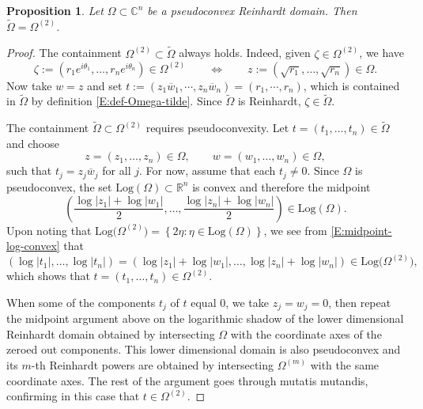 \documentclass[letterpaper,11pt,reqno]{amsart}
\theoremstyle{plain}
\newtheorem{proposition}[equation]{Proposition}
\theoremstyle{definition}
\theoremstyle{remark}
\theoremstyle{remark}
\numberwithin{equation}{section}
\newcommand{\ol}{\overline}
\newcommand{\wt}{\widetilde}
\newcommand{\C}{{\mathbb C}}
\newcommand{\R}{{\mathbb R}}
\begin{document}
\begin{proposition}\label{P:Omega-tilde=Omega2}
Let $\Omega \subset \C^n$ be a pseudoconvex Reinhardt domain.
Then $\wt\Omega = \Omega^{(2)}$.
\end{proposition}
\begin{proof}
The containment $\Omega^{(2)} \subset \wt\Omega$ always holds.
Indeed, given $\zeta \in \Omega^{(2)}$, we have
\[
\zeta := (r_1 e^{i\theta_1}, \dots, r_n e^{i\theta_n}) \in \Omega^{(2)} 
\qquad \Longleftrightarrow \qquad
z := \left(\sqrt{r_1}, \dots, \sqrt{r_n} \right) \in \Omega.
\]
Now take $w = z$ and set $t := (z_1\ol{w}_1,\cdots,z_n\ol{w}_n) = (r_1,\cdots,r_n)$, which is contained in $\wt\Omega$ by definition \eqref{E:def-Omega-tilde}.
Since $\wt\Omega$ is Reinhardt, $\zeta \in \wt\Omega$.

The containment $\wt\Omega \subset \Omega^{(2)}$ requires pseudoconvexity.
Let $t = (t_1,\dots,t_n) \in \wt\Omega$ and choose
\[
z = (z_1,\dots,z_n)\in \Omega, \qquad w = (w_1,\dots,w_n) \in \Omega,
\]
such that $t_j = z_j \ol{w}_j$ for all $j$.
For now, assume that each $t_j \neq 0$.
Since $\Omega$ is pseudoconvex, the set $\mathrm{Log}(\Omega) \subset \R^n$ is convex and therefore the midpoint
\begin{equation}\label{E:midpoint-log-convex}
\left( \frac{\log|z_1|+\log|w_1|}{2} , \dots, \frac{\log|z_n|+\log|w_n|}{2}\right) \in \mathrm{Log}(\Omega).
\end{equation}
Upon noting that $\mathrm{Log}\big(\Omega^{(2)}\big) 
= \left\{ 2\eta : \eta \in \mathrm{Log}(\Omega) \right\}$, we see from \eqref{E:midpoint-log-convex} that
\[
(\log|t_1|,\dots,\log|t_n| ) = (\log|z_1| + \log|w_1|,\dots, \log|z_n| + \log|w_n| ) \in \mathrm{Log}\big(\Omega^{(2)}\big),
\]
which shows that $t = (t_1,\dots,t_n) \in \Omega^{(2)}$.

When some of the components $t_j$ of $t$ equal $0$, we take $z_j = w_j = 0$, then repeat the midpoint argument above on the logarithmic shadow of the lower dimensional Reinhardt domain obtained by intersecting $\Omega$ with the coordinate axes of the zeroed out components.
This lower dimensional domain is also pseudoconvex and its $m$-th Reinhardt powers are obtained by intersecting $\Omega^{(m)}$ with the same coordinate axes.
The rest of the argument goes through mutatis mutandis, confirming in this case that $t \in \Omega^{(2)}$.
\end{proof}

\end{document}
